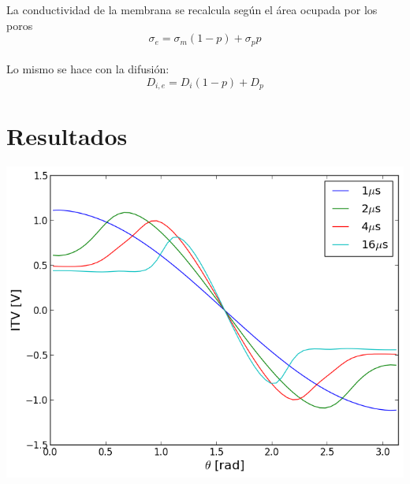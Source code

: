 \documentclass[a0,portrait]{a0poster}
\begin{document}
\begin{multicols}{2}
	La conductividad de la membrana se recalcula según el área ocupada por los poros		
	\begin{equation}
		\sigma_{e} = \sigma_m (1 - p) + \sigma_p p
	\end{equation}\\
	Lo mismo se hace con la difusión:
	\begin{equation}
		D_{i, e} = D_i (1 - p) + D_p
	\end{equation}



\section*{Resultados}


\begin{center}\vspace{1cm}
\includegraphics[width=0.8\linewidth]{itv-tita-50-64-80KVm}
\end{center}\vspace{1cm}


\end{multicols}
\end{document}

